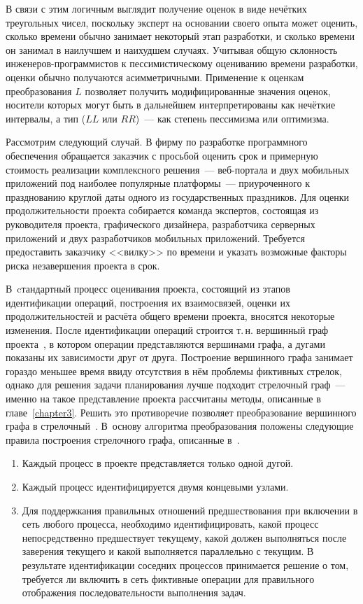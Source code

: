 В связи с этим логичным выглядит получение оценок в виде нечётких треугольных чисел, поскольку эксперт на основании своего опыта может оценить, сколько времени обычно занимает некоторый этап разработки, и сколько времени он занимал в наилучшем и наихудшем случаях. Учитывая общую склонность инженеров-программистов к пессимистическому оцениванию времени разработки, оценки обычно получаются асимметричными. Применение к оценкам преобразования $L$ позволяет получить модифицированные значения оценок, носители которых могут быть в дальнейшем интерпретированы как нечёткие интервалы, а тип ($LL$ или $RR$)~--- как степень пессимизма или оптимизма. 

Рассмотрим следующий случай. В фирму по разработке программного обеспечения обращается заказчик с просьбой оценить срок и примерную стоимость реализации комплексного решения~--- веб-портала и двух мобильных приложений под наиболее популярные платформы~--- приуроченного к празднованию круглой даты одного из государственных праздников. Для оценки продолжительности проекта собирается команда экспертов, состоящая из руководителя проекта, графического дизайнера, разработчика серверных приложений и двух разработчиков мобильных приложений. Требуется предоставить заказчику <<вилку>> по времени и указать возможные факторы риска незавершения проекта в срок.

В~cтандартный процесс оценивания проекта, состоящий из этапов идентификации операций, построения их взаимосвязей, оценки их продолжительностей и расчёта общего времени проекта, вносятся некоторые изменения. После идентификации операций строится т.\,н. вершинный граф проекта~\cite{Eddous, Taha_Operation_Research}, в котором операции представляются вершинами графа, а дугами показаны их зависимости друг от друга. Построение вершинного графа занимает гораздо меньшее время ввиду отсутствия в нём проблемы фиктивных стрелок, однако для решения задачи планирования лучше подходит стрелочный граф~--- именно на такое представление проекта рассчитаны методы, описанные в главе~\ref{chapter3}. Решить это противоречие позволяет преобразование вершинного графа в стрелочный~\cite{VSU-5y}. В~основу алгоритма преобразования положены следующие правила построения стрелочного графа, описанные в~\cite{Eddous, Taha_Operation_Research}.
\begin{enumerate}
\label{Taha:ConversionRules}
  \item Каждый процесс в проекте представляется только одной дугой.
  \item Каждый процесс идентифицируется двумя концевыми узлами.
  \item Для поддержкания правильных отношений предшествования при включении в сеть любого процесса, необходимо идентифицировать, какой процесс непосредственно предшествует текущему, какой должен выполняться после заверения текущего и какой выполняется параллельно с текущим. В результате идентификации соседних процессов принимается решение о том, требуется ли включить в сеть фиктивные операции для правильного отображения последовательности выполнения задач.
\end{enumerate}

